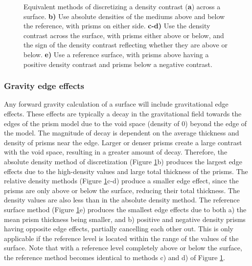 \begin{figure}[!ht]
    \centering
    
    \caption[Equivalent methods of discretizing a density contrast]{Equivalent methods of discretizing a density contrast (\textbf{a}) across a surface. \textbf{b)} Use absolute densities of the mediums above and below the reference, with prisms on either side. \textbf{c-d)} Use the density contrast across the surface, with prisms either above or below, and the sign of the density contrast reflecting whether they are above or below. \textbf{e)} Use a reference surface, with prisms above having a positive density contrast and prisms below a negative contrast.}
    \label{fig:chp3_discretization}
\end{figure}

\subsubsection{Gravity edge effects} \label{chp3_edge_effects}
Any forward gravity calculation of a surface will include gravitational edge effects. These effects are typically a decay in the gravitational field towards the edges of the prism model due to the void space (density of 0) beyond the edge of the model. The magnitude of decay is dependent on the average thickness and density of prisms near the edge. Larger or denser prisms create a large contrast with the void space, resulting in a greater amount of decay. Therefore, the absolute density method of discretization (Figure \ref{fig:chp3_discretization}b) produces the largest edge effects due to the high-density values and large total thickness of the prisms. The relative density methods (Figure \ref{fig:chp3_discretization}c-d) produce a smaller edge effect, since the prisms are only above or below the surface, reducing their total thickness. The density values are also less than in the absolute density method. The reference surface method (Figure \ref{fig:chp3_discretization}e) produces the smallest edge effects due to both a) the mean prism thickness being smaller, and b) positive and negative density prisms having opposite edge effects, partially cancelling each other out. This is only applicable if the reference level is located within the range of the values of the surface. Note that with a reference level completely above or below the surface, the reference method becomes identical to methods c) and d) of Figure \ref{fig:chp3_discretization}. \\

